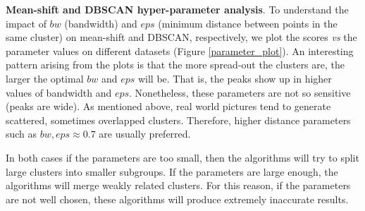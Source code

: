 \documentclass[conference]{IEEEtran}
\begin{document}
\textbf{Mean-shift and DBSCAN hyper-parameter analysis}. To understand the impact of $bw$ (bandwidth) and $eps$ (minimum distance between points in the same cluster) on mean-shift and DBSCAN, respectively, we plot the scores \textit{vs} the parameter values on different datasets (Figure \ref{parameter_plot}).
An interesting pattern arising from the plots is that the more spread-out the clusters are, the larger the optimal $bw$ and $eps$ will be.
That is, the peaks show up in higher values of bandwidth and $eps$.
Nonetheless, these parameters are not so sensitive (peaks are wide).
As mentioned above, real world pictures tend to generate scattered, sometimes overlapped clusters.
Therefore, higher distance parameters such as $bw, eps \approx 0.7$ are usually preferred.

In both cases if the parameters are too small, then the algorithms will try to split large clusters into smaller subgroups.
If the parameters are large enough, the algorithms will merge weakly related clusters.
For this reason, if the parameters are not well chosen, these algorithms will produce extremely inaccurate results.
\end{document}
